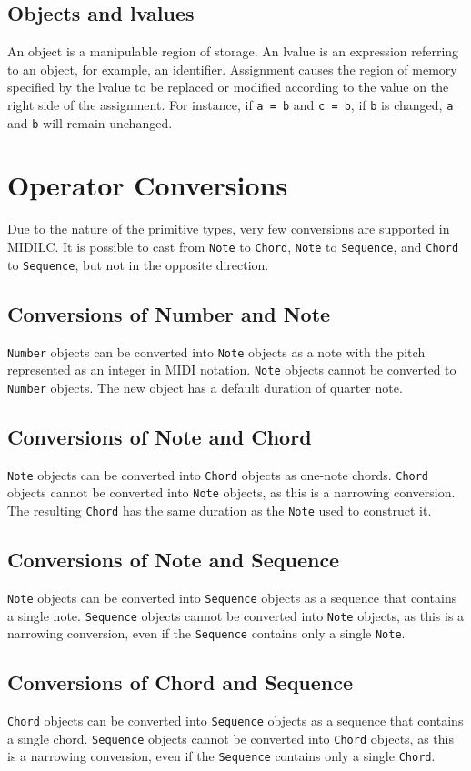 \documentclass[12pt,A4]{book}
\begin{document}
\subsection{Objects and lvalues}
An object is a manipulable region of storage. An lvalue is an expression referring to an object, for example, an identifier.  Assignment causes the region of memory specified by the lvalue to be replaced or modified according to the value on the right side of the assignment.  For instance, if \verb|a = b| and \verb|c = b|, if \verb|b| is changed, \verb|a| and \verb|b| will remain unchanged.
\section{Operator Conversions}
Due to the nature of the primitive types, very few conversions are supported in MIDILC. It is possible to cast from \verb|Note| to \verb|Chord|, \verb|Note| to \verb|Sequence|, and \verb|Chord| to \verb|Sequence|, but not in the opposite direction.
\subsection{Conversions of Number and Note}
\verb|Number| objects can be converted into \verb|Note| objects as a note with the pitch represented as an integer in MIDI notation. \verb|Note| objects cannot be converted to \verb|Number| objects. The new object has a default duration of quarter note.
\subsection{Conversions of Note and Chord}
\verb|Note| objects can be converted into \verb|Chord| objects as one-note chords. \verb|Chord| objects cannot be converted into \verb|Note| objects, as this is a narrowing conversion. The resulting \verb|Chord| has the same duration as the \verb|Note| used to construct it.
\subsection{Conversions of Note and Sequence}
\verb|Note| objects can be converted into \verb|Sequence| objects as a sequence that contains a single note. \verb|Sequence| objects cannot be converted into \verb|Note| objects, as this is a narrowing conversion, even if the \verb|Sequence| contains only a single \verb|Note|.
\subsection{Conversions of Chord and Sequence}
\verb|Chord| objects can be converted into \verb|Sequence| objects as a sequence that contains a single chord. \verb|Sequence| objects cannot be converted into \verb|Chord| objects, as this is a narrowing conversion, even if the \verb|Sequence| contains only a single \verb|Chord|.
\end{document}
